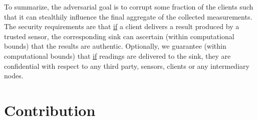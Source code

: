 To summarize, the adversarial goal is to corrupt some fraction of the clients such that it can stealthily influence the final aggregate of the collected measurements. The security requirements are that \underline{if} a client delivers a result produced by a trusted sensor, the corresponding sink can ascertain (within computational bounds) that the results are authentic. Optionally, we guarantee (within computational bounds) that \underline{if} readings are delivered to the sink, they are confidential with respect to any third party, sensors, clients or any intermediary nodes.


\section{Contribution}

